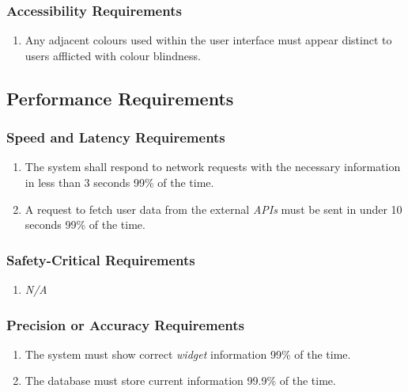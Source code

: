 \documentclass{article}
\begin{document}
\subsubsection{Accessibility Requirements}
\label{ssub:accessibility_requirements}
\begin{enumerate}[{UH}1.]
	\item Any adjacent colours used within the user interface must appear distinct to users afflicted with colour blindness.
\end{enumerate}

\subsection{Performance Requirements}
\label{sub:performance_requirements}

\subsubsection{Speed and Latency Requirements}
\label{ssub:speed_and_latency_requirements}
\begin{enumerate}[{PR}1. ]
	\item The system shall respond to network requests with the necessary information in less than 3 seconds 99\% of the time.
	\item A request to fetch user data from the external \textit{APIs} must be sent in under 10 seconds 99\% of the time.
\end{enumerate}

\subsubsection{Safety-Critical Requirements}
\label{ssub:safety_critical_requirements}
\begin{enumerate}[{PR}1. ]
    \item \emph{N/A}
\end{enumerate}

\subsubsection{Precision or Accuracy Requirements}
\label{ssub:precision_or_accuracy_requirements}
\begin{enumerate}[{PR}1. ]
	\item The system must show correct \textit{widget} information 99\% of the time.
	\item The database must store current information 99.9\% of the time.
\end{enumerate}
\end{document}
